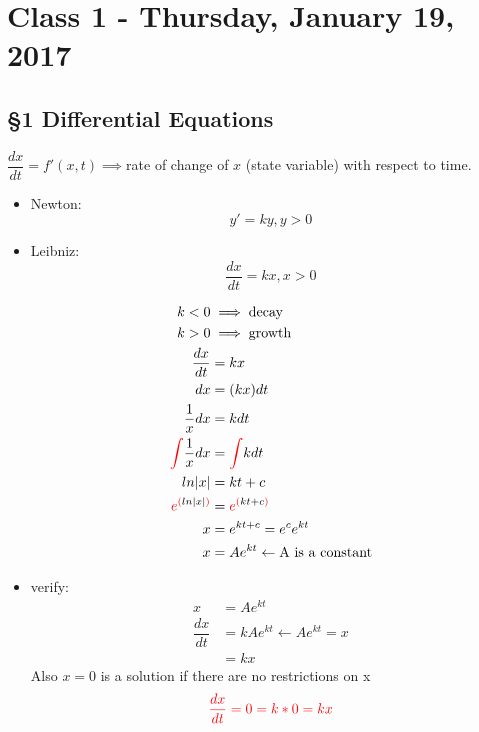 \chapter{Class 1 - Thursday, January 19, 2017}
\section{\S 1 Differential Equations}

\begin{remark} $\dfrac{dx}{dt}=f'(x,t) \implies $rate of change of $x$ (state variable) with respect to time.
\begin{itemize}
\item Newton:$$y'=ky,y>0$$
\item Leibniz:$$\dfrac{dx}{dt}=kx,x>0$$

\begin{align*}
    k<0 & \implies \text{decay}\\
    k>0 & \implies \text{growth}\\
    \dfrac{dx}{dt} & =kx\\
    dx & =(kx)dt\\
    \frac{1}{x} dx & = k dt\\
    \textcolor{red}{\int} \frac{1}{x} dx & =\textcolor{red}{\int} k dt\\
    ln|x| & = kt+c\\
    \textcolor{red}{e}^{\textcolor{red}{(}ln|x|\textcolor{red}{)}} & = \textcolor{red}{e}^{\textcolor{red}{(}kt+c\textcolor{red}{)}}\\
    x & = e^{kt+c} = e^{c}e^{kt}\\
    x & = Ae^{kt} \leftarrow \text{A is a constant}
\end{align*}
\item verify:
\begin{align*}
    x & =Ae^{kt}\\
    \dfrac{dx}{dt} & =kAe^{kt} \leftarrow Ae^{kt} = x\\
    & = kx
\end{align*}
Also $x=0$ is a solution if there are no restrictions on x
$$\textcolor{red}{\dfrac{dx}{dt} = 0 = k*0 = kx}$$
\end{itemize}
\end{remark}
